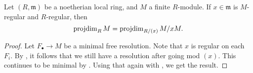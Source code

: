 \documentclass[12pt]{article}
\begin{document}
\begin{cor} \label{cor:projdim-mod-regular-sequence}
	Let $(R, \mathfrak{m})$ be a noetherian local ring, and $M$ a finite $R$-module. If $x \in \mathfrak{m}$ is $M$-regular and $R$-regular, then
	\begin{equation*} 
		\operatorname{projdim}_{R} M = \operatorname{projdim}_{R/(x)} M/x M.
	\end{equation*}
\end{cor}
\begin{proof} 
	Let $F_{\bullet} \to M$ be a minimal free resolution. Note that $x$ is regular on each $F_{i}$. By , it follows that we still have a resolution after going mod $(x)$. This continues to be minimal by . Using that again with , we get the result.
\end{proof}
\end{document}
